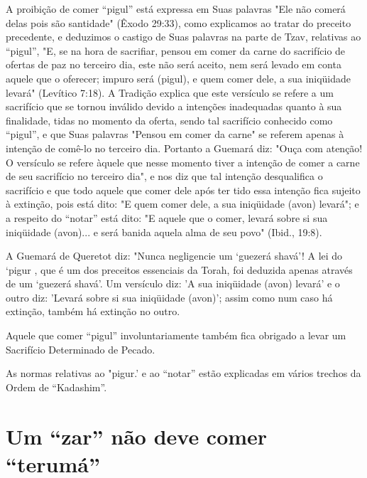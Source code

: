 A proibição de comer ``pigul'' está expressa em Suas palavras "Ele não
comerá delas pois são santidade" (Êxodo 29:33), como explicamos ao
tra­tar do preceito precedente, e deduzimos o castigo de Suas palavras
na parte de Tzav, relativas ao ``pigul'', "E, se na hora de sacrifiar,
pensou em comer da carne do sacrifício de ofertas de paz no terceiro
dia, este não será aceito, nem será levado em conta aquele que o
oferecer; impuro será (pigul), e quem comer dele, a sua iniqüidade
levará" (Levítico 7:18). A Tradição explica que este versículo se refere
a um sacrifício que se tornou inválido devido a intenções
inadequadas quanto à sua finalidade, tidas no momento da oferta, sendo
tal sa­crifício conhecido como ``pigul'', e que Suas palavras "Pensou em
comer da carne" se referem apenas à intenção de comê-lo no terceiro dia.
Portanto a Gue­mará diz: "Ouça com atenção! O versículo se refere àquele
que nesse momen­to tiver a intenção de comer a carne de seu sacrifício
no terceiro dia", e nos diz que tal intenção desqualifica o sacrifício e
que todo aquele que comer dele após ter tido essa intenção fica sujeito
à extinção, pois está dito: "E quem co­mer dele, a sua iniqüidade (avon)
levará"; e a respeito do ``notar'' está dito: "E aquele que o comer,
levará sobre si sua iniqüidade (avon)... e será banida aquela alma de
seu povo" (Ibid., 19:8).

A Guemará de Queretot diz: "Nunca negligencie um `guezerá sha­vá'! A lei
do `pigur , que é um dos preceitos essenciais da Torah, foi deduzida
apenas através de um `guezerá shavá'. Um versículo diz: 'A sua
iniqüidade (avon) levará' e o outro diz: 'Levará sobre si sua iniqüidade
(avon)'; assim como num caso há extinção, também há extinção no outro.

Aquele que comer ``pigul'' involuntariamente também fica obriga­do a levar
um Sacrifício Determinado de Pecado.

As normas relativas ao "pigur.' e ao ``notar'' estão explicadas em vá­rios
trechos da Ordem de ``Kadashim''.

\section{Um ``zar'' não deve comer ``terumá''}


